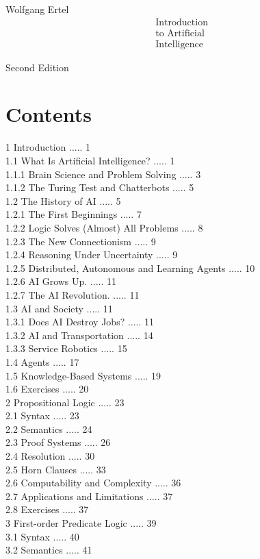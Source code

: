 \documentclass[10pt]{book}
\begin{document}
\tableofcontents


Wolfgang Ertel
$$
\begin{aligned}
& \text { Introduction } \\
& \text { to Artificial } \\
& \text { Intelligence }
\end{aligned}
$$

Second Edition

\chapter{Contents}
1 Introduction ..... 1\\
1.1 What Is Artificial Intelligence? ..... 1\\
1.1.1 Brain Science and Problem Solving ..... 3\\
1.1.2 The Turing Test and Chatterbots ..... 5\\
1.2 The History of AI ..... 5\\
1.2.1 The First Beginnings ..... 7\\
1.2.2 Logic Solves (Almost) All Problems ..... 8\\
1.2.3 The New Connectionism ..... 9\\
1.2.4 Reasoning Under Uncertainty ..... 9\\
1.2.5 Distributed, Autonomous and Learning Agents ..... 10\\
1.2.6 AI Grows Up. ..... 11\\
1.2.7 The AI Revolution. ..... 11\\
1.3 AI and Society ..... 11\\
1.3.1 Does AI Destroy Jobs? ..... 11\\
1.3.2 AI and Transportation ..... 14\\
1.3.3 Service Robotics ..... 15\\
1.4 Agents ..... 17\\
1.5 Knowledge-Based Systems ..... 19\\
1.6 Exercises ..... 20\\
2 Propositional Logic ..... 23\\
2.1 Syntax ..... 23\\
2.2 Semantics ..... 24\\
2.3 Proof Systems ..... 26\\
2.4 Resolution ..... 30\\
2.5 Horn Clauses ..... 33\\
2.6 Computability and Complexity ..... 36\\
2.7 Applications and Limitations ..... 37\\
2.8 Exercises ..... 37\\
3 First-order Predicate Logic ..... 39\\
3.1 Syntax ..... 40\\
3.2 Semantics ..... 41\\
\end{document}
